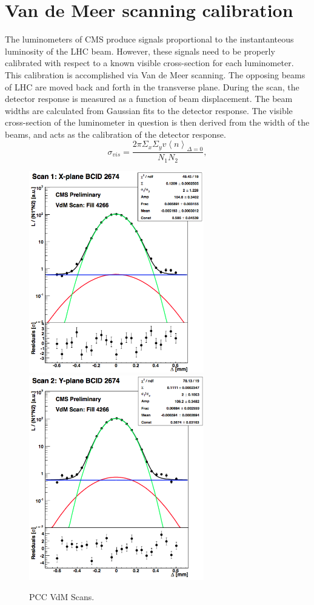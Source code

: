 \section{Van de Meer scanning calibration}

The luminometers of CMS produce signals proportional to the instantanteous luminosity of the LHC beam. However, these signals need to be properly calibrated with respect to a known visible cross-section for each luminometer. This calibration is accomplished via Van de Meer scanning. The opposing beams of LHC are moved back and forth in the transverse plane. During the scan, the detector response is measured as a function of beam displacement. The beam widths are calculated from Gaussian fits to the detector response. The visible cross-section of the luminometer in question is then derived from the width of the beams, and acts as the calibration of the detector response. 
\begin{equation}
\sigma_{vis} = \frac{2 \pi \Sigma_x \Sigma_y v\left \langle n \right \rangle_{\Delta=0}}{N_1 N_2},
\end{equation}
\begin{figure}[h!]
\begin{centering}
\includegraphics[width=3in]{Chapter4/importfigs/CMS-PAS-LUM-15-001_Figure_005-a.png}
\includegraphics[width=3in]{Chapter4/importfigs/CMS-PAS-LUM-15-001_Figure_005-b.png}
\par\end{centering}
\caption{PCC VdM Scans. \label{fig:pccVdMScans}}
\end{figure}


